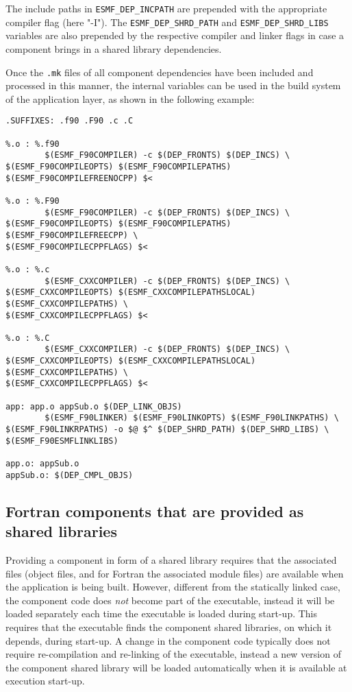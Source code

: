 The include paths in {\tt ESMF\_DEP\_INCPATH} are prepended with the appropriate compiler flag (here "-I"). The {\tt ESMF\_DEP\_SHRD\_PATH} and {\tt ESMF\_DEP\_SHRD\_LIBS} variables are also prepended by the respective compiler and linker flags in case a component brings in a shared library dependencies.

Once the {\tt .mk} files of all component dependencies have been included and processed in this manner, the internal variables can be used in the build system of the application layer, as shown in the following example:

\begin{verbatim}
.SUFFIXES: .f90 .F90 .c .C

%.o : %.f90
        $(ESMF_F90COMPILER) -c $(DEP_FRONTS) $(DEP_INCS) \
$(ESMF_F90COMPILEOPTS) $(ESMF_F90COMPILEPATHS) $(ESMF_F90COMPILEFREENOCPP) $<

%.o : %.F90
        $(ESMF_F90COMPILER) -c $(DEP_FRONTS) $(DEP_INCS) \
$(ESMF_F90COMPILEOPTS) $(ESMF_F90COMPILEPATHS) $(ESMF_F90COMPILEFREECPP) \
$(ESMF_F90COMPILECPPFLAGS) $<
        
%.o : %.c
        $(ESMF_CXXCOMPILER) -c $(DEP_FRONTS) $(DEP_INCS) \
$(ESMF_CXXCOMPILEOPTS) $(ESMF_CXXCOMPILEPATHSLOCAL) $(ESMF_CXXCOMPILEPATHS) \
$(ESMF_CXXCOMPILECPPFLAGS) $<

%.o : %.C
        $(ESMF_CXXCOMPILER) -c $(DEP_FRONTS) $(DEP_INCS) \
$(ESMF_CXXCOMPILEOPTS) $(ESMF_CXXCOMPILEPATHSLOCAL) $(ESMF_CXXCOMPILEPATHS) \ 
$(ESMF_CXXCOMPILECPPFLAGS) $<

app: app.o appSub.o $(DEP_LINK_OBJS)
        $(ESMF_F90LINKER) $(ESMF_F90LINKOPTS) $(ESMF_F90LINKPATHS) \
$(ESMF_F90LINKRPATHS) -o $@ $^ $(DEP_SHRD_PATH) $(DEP_SHRD_LIBS) \
$(ESMF_F90ESMFLINKLIBS)

app.o: appSub.o
appSub.o: $(DEP_CMPL_OBJS)

\end{verbatim}

\subsection{Fortran components that are provided as shared libraries}
\label{StandardCompDep:FortranSharedLib}

Providing a component in form of a shared library requires that the associated files (object files, and for Fortran the associated module files) are available when the application is being built. However, different from the statically linked case, the component code does {\em not} become part of the executable, instead it will be loaded separately each time the executable is loaded during start-up. This requires that the executable finds the component shared libraries, on which it depends, during start-up. A change in the component code typically does not require re-compilation and re-linking of the executable, instead a new version of the component shared library will be loaded automatically when it is available at execution start-up.

